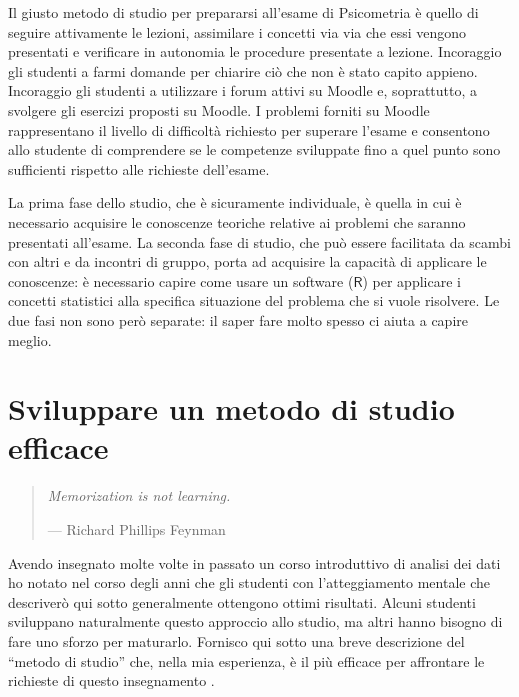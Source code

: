 \documentclass[
  10pt,
  italian,
  a4paper,
  extrafontsizes,onecolumn,openright
  ]{memoir}
\begin{document}
Il giusto metodo di studio per prepararsi all'esame di Psicometria è quello di seguire attivamente le lezioni, assimilare i concetti via via che essi vengono presentati e verificare in autonomia le procedure presentate a lezione. Incoraggio gli studenti a farmi domande per chiarire ciò che non è stato capito appieno. Incoraggio gli studenti a utilizzare i forum attivi su Moodle e, soprattutto, a svolgere gli esercizi proposti su Moodle. I problemi forniti su Moodle rappresentano il livello di difficoltà richiesto per superare l'esame e consentono allo studente di comprendere se le competenze sviluppate fino a quel punto sono sufficienti rispetto alle richieste dell'esame.

La prima fase dello studio, che è sicuramente individuale, è quella in cui è necessario acquisire le conoscenze teoriche relative ai problemi che saranno presentati all'esame. La seconda fase di studio, che può essere facilitata da scambi con altri e da incontri di gruppo, porta ad acquisire la capacità di applicare le conoscenze: è necessario capire come usare un software (\(\textsf{R}\)) per applicare i concetti statistici alla specifica situazione del problema che si vuole risolvere. Le due fasi non sono però separate: il saper fare molto spesso ci aiuta a capire meglio.

\hypertarget{sviluppare-un-metodo-di-studio-efficace}{%
\section*{Sviluppare un metodo di studio efficace}\label{sviluppare-un-metodo-di-studio-efficace}}

\begin{quote}
\emph{Memorization is not learning.}

\hfill --- Richard Phillips Feynman
\end{quote}

Avendo insegnato molte volte in passato un corso introduttivo di analisi dei dati ho notato nel corso degli anni che gli studenti con l'atteggiamento mentale che descriverò qui sotto generalmente ottengono ottimi risultati. Alcuni studenti sviluppano naturalmente questo approccio allo studio, ma altri hanno bisogno di fare uno sforzo per maturarlo. Fornisco qui sotto una breve descrizione del ``metodo di studio'' che, nella mia esperienza, è il più efficace per affrontare le richieste di questo insegnamento \autocite{burger20125}.
\end{document}

